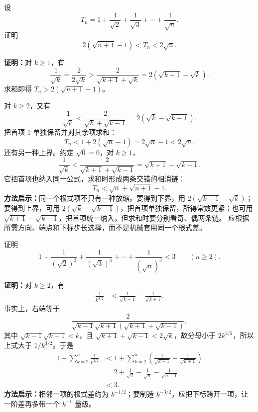 \begin{examplebox}
  设
  \[
    T_n=1+\frac1{\sqrt2}+\frac1{\sqrt3}+\cdots+\frac1{\sqrt n}.
  \]
  证明
  \[
    2(\sqrt{n+1}-1)<T_n<2\sqrt n.
  \]

  \textbf{证明：}对 $k\ge1$，有
  \[
    \frac1{\sqrt k}
      =\frac2{2\sqrt k}
      >\frac2{\sqrt{k+1}+\sqrt k}
      =2(\sqrt{k+1}-\sqrt k).
  \]
  求和即得 $T_n>2(\sqrt{n+1}-1)$。

  对 $k\ge2$，又有
  \[
    \frac1{\sqrt k}
      <\frac2{\sqrt k+\sqrt{k-1}}
      =2(\sqrt k-\sqrt{k-1}).
  \]
  把首项 $1$ 单独保留并对其余项求和：
  \[
    T_n<1+2(\sqrt n-1)=2\sqrt n-1<2\sqrt n.
  \]
  还有另一种上界。约定 $\sqrt0=0$，对 $k\ge1$，
  \[
    \frac1{\sqrt k}
      <\frac2{\sqrt{k+1}+\sqrt{k-1}}
      =\sqrt{k+1}-\sqrt{k-1}.
  \]
  它把首项也纳入同一公式，求和时形成两条交错的相消链：
  \[
    T_n<\sqrt n+\sqrt{n+1}-1.
  \]
  \textbf{方法启示：}同一个根式项不只有一种放缩。要得到下界，用
  $2(\sqrt{k+1}-\sqrt k)$；要得到上界，可用
  $2(\sqrt k-\sqrt{k-1})$，把首项单独保留，所得常数更紧；也可用
  $\sqrt{k+1}-\sqrt{k-1}$，把首项统一纳入，但求和时要分别看奇、偶两条链。
  应根据所需方向、端点和下标步长选择，而不是机械套用同一个根式差。
\end{examplebox}

\begin{examplebox}
  证明
  \[
    1+\frac1{(\sqrt2)^3}+\frac1{(\sqrt3)^3}
      +\cdots+\frac1{(\sqrt n)^3}<3
    \qquad(n\ge2).
  \]

  \textbf{证明：}对 $k\ge2$，有
  \begin{align*}
    \frac1{k^{3/2}}
      &<\frac1{\sqrt{k-1}}-\frac1{\sqrt{k+1}}.
  \end{align*}
  事实上，右端等于
  \[
    \frac{2}{\sqrt{k-1}\sqrt{k+1}
      (\sqrt{k+1}+\sqrt{k-1})},
  \]
  其中 $\sqrt{k-1}\sqrt{k+1}<k$，且
  $\sqrt{k+1}+\sqrt{k-1}<2\sqrt k$，故分母小于 $2k^{3/2}$，所以上式大于
  $1/k^{3/2}$。于是
  \begin{align*}
    1+\sum_{k=2}^{n}\frac1{k^{3/2}}
      &<1+\sum_{k=2}^{n}
        \left(\frac1{\sqrt{k-1}}-\frac1{\sqrt{k+1}}\right)\\
      &=2+\frac1{\sqrt2}-\frac1{\sqrt n}-\frac1{\sqrt{n+1}}\\
      &<3.
  \end{align*}
  \textbf{方法启示：}相邻一项的根式差约为 $k^{-1/2}$；要制造 $k^{-3/2}$，应把下标跨开一项，让一阶差再多带一个 $k^{-1}$ 量级。
\end{examplebox}

